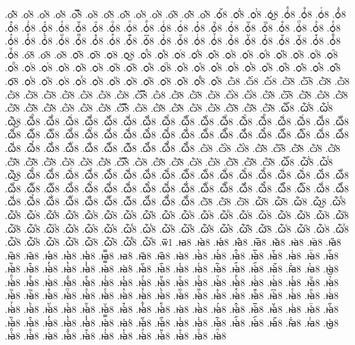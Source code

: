 {.ѻ҆̑8
.ѻ҆̓8
.ѻ҆̔8
.ѻ҆̾8
.ѻ҆̿8
.ѻ҆͘8
.ѻ҆҃8
.ѻ҆҄8
.ѻ҆҅8
.ѻ҆҆8
.ѻ҆҇8
.ѻ҆᷀8
.ѻ҆᷁8
.ѻ҆᷶8
.ѻ᷷҆8
.ѻ᷸҆8
.ѻ᷹҆8
.ѻ҆ⷠ8
.ѻ҆ⷡ8
.ѻ҆ⷢ8
.ѻ҆ⷣ8
.ѻ҆ⷤ8
.ѻ҆ⷥ8
.ѻ҆ⷦ8
.ѻ҆ⷧ8
.ѻ҆ⷨ8
.ѻ҆ⷩ8
.ѻ҆ⷪ8
.ѻ҆ⷫ8
.ѻ҆ⷬ8
.ѻ҆ⷭ8
.ѻ҆ⷮ8
.ѻ҆ⷯ8
.ѻ҆ⷰ8
.ѻ҆ⷱ8
.ѻ҆ⷲ8
.ѻ҆ⷳ8
.ѻ҆ⷴ8
.ѻ҆ⷵ8
.ѻ҆ⷶ8
.ѻ҆ⷷ8
.ѻ҆ⷸ8
.ѻ҆ⷹ8
.ѻ҆ⷺ8
.ѻ҆ⷻ8
.ѻ҆ⷼ8
.ѻ҆ⷽ8
.ѻ҆ⷾ8
.ѻ҆ⷿ8
.ѻ҆꙯8
.ѻ҆ꙴ8
.ѻ҆ꙵ8
.ѻ҆ꙶ8
.ѻ҆ꙷ8
.ѻ҆ꙸ8
.ѻ҆ꙹ8
.ѻ҆ꙺ8
.ѻ҆ꙻ8
.ѻ҆꙼8
.ѻ҆꙽8
.ѻ҆ꚞ8
.ѻ҆ꚟ8
.ѻ҇8
.ѻ᷀8
.ѻ᷁8
.ѻ᷶8
.ѻ᷷8
.ѻ᷸8
.ѻ᷹8
.ѻⷠ8
.ѻⷡ8
.ѻⷢ8
.ѻⷣ8
.ѻⷤ8
.ѻⷥ8
.ѻⷦ8
.ѻⷧ8
.ѻⷨ8
.ѻⷩ8
.ѻⷪ8
.ѻⷫ8
.ѻⷬ8
.ѻⷭ8
.ѻⷮ8
.ѻⷯ8
.ѻⷰ8
.ѻⷱ8
.ѻⷲ8
.ѻⷳ8
.ѻⷴ8
.ѻⷵ8
.ѻⷶ8
.ѻⷷ8
.ѻⷸ8
.ѻⷹ8
.ѻⷺ8
.ѻⷻ8
.ѻⷼ8
.ѻⷽ8
.ѻⷾ8
.ѻⷿ8
.ѻ꙯8
.ѻꙴ8
.ѻꙵ8
.ѻꙶ8
.ѻꙷ8
.ѻꙸ8
.ѻꙹ8
.ѻꙺ8
.ѻꙻ8
.ѻ꙼8
.ѻ꙽8
.ѻꚞ8
.ѻꚟ8
.ѽ8
.ѽ̀8
.ѽ́8
.ѽ̂8
.ѽ̅8
.ѽ̆8
.ѽ̇8
.ѽ̈8
.ѽ̋8
.ѽ̏8
.ѽ̑8
.ѽ̓8
.ѽ̔8
.ѽ̾8
.ѽ̿8
.ѽ͘8
.ѽ҃8
.ѽ҄8
.ѽ҅8
.ѽ҅̀8
.ѽ҅́8
.ѽ҅̂8
.ѽ҅̅8
.ѽ҅̆8
.ѽ҅̇8
.ѽ҅̈8
.ѽ҅̋8
.ѽ҅̏8
.ѽ҅̑8
.ѽ҅̓8
.ѽ҅̔8
.ѽ҅̾8
.ѽ҅̿8
.ѽ҅͘8
.ѽ҅҃8
.ѽ҅҄8
.ѽ҅҅8
.ѽ҅҆8
.ѽ҅҇8
.ѽ҅᷀8
.ѽ҅᷁8
.ѽ҅᷶8
.ѽ᷷҅8
.ѽ᷸҅8
.ѽ᷹҅8
.ѽ҅ⷠ8
.ѽ҅ⷡ8
.ѽ҅ⷢ8
.ѽ҅ⷣ8
.ѽ҅ⷤ8
.ѽ҅ⷥ8
.ѽ҅ⷦ8
.ѽ҅ⷧ8
.ѽ҅ⷨ8
.ѽ҅ⷩ8
.ѽ҅ⷪ8
.ѽ҅ⷫ8
.ѽ҅ⷬ8
.ѽ҅ⷭ8
.ѽ҅ⷮ8
.ѽ҅ⷯ8
.ѽ҅ⷰ8
.ѽ҅ⷱ8
.ѽ҅ⷲ8
.ѽ҅ⷳ8
.ѽ҅ⷴ8
.ѽ҅ⷵ8
.ѽ҅ⷶ8
.ѽ҅ⷷ8
.ѽ҅ⷸ8
.ѽ҅ⷹ8
.ѽ҅ⷺ8
.ѽ҅ⷻ8
.ѽ҅ⷼ8
.ѽ҅ⷽ8
.ѽ҅ⷾ8
.ѽ҅ⷿ8
.ѽ҅꙯8
.ѽ҅ꙴ8
.ѽ҅ꙵ8
.ѽ҅ꙶ8
.ѽ҅ꙷ8
.ѽ҅ꙸ8
.ѽ҅ꙹ8
.ѽ҅ꙺ8
.ѽ҅ꙻ8
.ѽ҅꙼8
.ѽ҅꙽8
.ѽ҅ꚞ8
.ѽ҅ꚟ8
.ѽ҆8
.ѽ҆̀8
.ѽ҆́8
.ѽ҆̂8
.ѽ҆̅8
.ѽ҆̆8
.ѽ҆̇8
.ѽ҆̈8
.ѽ҆̋8
.ѽ҆̏8
.ѽ҆̑8
.ѽ҆̓8
.ѽ҆̔8
.ѽ҆̾8
.ѽ҆̿8
.ѽ҆͘8
.ѽ҆҃8
.ѽ҆҄8
.ѽ҆҅8
.ѽ҆҆8
.ѽ҆҇8
.ѽ҆᷀8
.ѽ҆᷁8
.ѽ҆᷶8
.ѽ᷷҆8
.ѽ᷸҆8
.ѽ᷹҆8
.ѽ҆ⷠ8
.ѽ҆ⷡ8
.ѽ҆ⷢ8
.ѽ҆ⷣ8
.ѽ҆ⷤ8
.ѽ҆ⷥ8
.ѽ҆ⷦ8
.ѽ҆ⷧ8
.ѽ҆ⷨ8
.ѽ҆ⷩ8
.ѽ҆ⷪ8
.ѽ҆ⷫ8
.ѽ҆ⷬ8
.ѽ҆ⷭ8
.ѽ҆ⷮ8
.ѽ҆ⷯ8
.ѽ҆ⷰ8
.ѽ҆ⷱ8
.ѽ҆ⷲ8
.ѽ҆ⷳ8
.ѽ҆ⷴ8
.ѽ҆ⷵ8
.ѽ҆ⷶ8
.ѽ҆ⷷ8
.ѽ҆ⷸ8
.ѽ҆ⷹ8
.ѽ҆ⷺ8
.ѽ҆ⷻ8
.ѽ҆ⷼ8
.ѽ҆ⷽ8
.ѽ҆ⷾ8
.ѽ҆ⷿ8
.ѽ҆꙯8
.ѽ҆ꙴ8
.ѽ҆ꙵ8
.ѽ҆ꙶ8
.ѽ҆ꙷ8
.ѽ҆ꙸ8
.ѽ҆ꙹ8
.ѽ҆ꙺ8
.ѽ҆ꙻ8
.ѽ҆꙼8
.ѽ҆꙽8
.ѽ҆ꚞ8
.ѽ҆ꚟ8
.ѽ҇8
.ѽ᷀8
.ѽ᷁8
.ѽ᷶8
.ѽ᷷8
.ѽ᷸8
.ѽ᷹8
.ѽⷠ8
.ѽⷡ8
.ѽⷢ8
.ѽⷣ8
.ѽⷤ8
.ѽⷥ8
.ѽⷦ8
.ѽⷧ8
.ѽⷨ8
.ѽⷩ8
.ѽⷪ8
.ѽⷫ8
.ѽⷬ8
.ѽⷭ8
.ѽⷮ8
.ѽⷯ8
.ѽⷰ8
.ѽⷱ8
.ѽⷲ8
.ѽⷳ8
.ѽⷴ8
.ѽⷵ8
.ѽⷶ8
.ѽⷷ8
.ѽⷸ8
.ѽⷹ8
.ѽⷺ8
.ѽⷻ8
.ѽⷼ8
.ѽⷽ8
.ѽⷾ8
.ѽⷿ8
.ѽ꙯8
.ѽꙴ8
.ѽꙵ8
.ѽꙶ8
.ѽꙷ8
.ѽꙸ8
.ѽꙹ8
.ѽꙺ8
.ѽꙻ8
.ѽ꙼8
.ѽ꙽8
.ѽꚞ8
.ѽꚟ8
.ѿ1
.ꙗ8
.ꙗ̀8
.ꙗ́8
.ꙗ̂8
.ꙗ̅8
.ꙗ̆8
.ꙗ̇8
.ꙗ̈8
.ꙗ̋8
.ꙗ̏8
.ꙗ̑8
.ꙗ̓8
.ꙗ̔8
.ꙗ̾8
.ꙗ̿8
.ꙗ͘8
.ꙗ҃8
.ꙗ҄8
.ꙗ҅8
.ꙗ҅̀8
.ꙗ҅́8
.ꙗ҅̂8
.ꙗ҅̅8
.ꙗ҅̆8
.ꙗ҅̇8
.ꙗ҅̈8
.ꙗ҅̋8
.ꙗ҅̏8
.ꙗ҅̑8
.ꙗ҅̓8
.ꙗ҅̔8
.ꙗ҅̾8
.ꙗ҅̿8
.ꙗ҅͘8
.ꙗ҅҃8
.ꙗ҅҄8
.ꙗ҅҅8
.ꙗ҅҆8
.ꙗ҅҇8
.ꙗ҅᷀8
.ꙗ҅᷁8
.ꙗ҅᷶8
.ꙗ᷷҅8
.ꙗ᷸҅8
.ꙗ᷹҅8
.ꙗ҅ⷠ8
.ꙗ҅ⷡ8
.ꙗ҅ⷢ8
.ꙗ҅ⷣ8
.ꙗ҅ⷤ8
.ꙗ҅ⷥ8
.ꙗ҅ⷦ8
.ꙗ҅ⷧ8
.ꙗ҅ⷨ8
.ꙗ҅ⷩ8
.ꙗ҅ⷪ8
.ꙗ҅ⷫ8
.ꙗ҅ⷬ8
.ꙗ҅ⷭ8
.ꙗ҅ⷮ8
.ꙗ҅ⷯ8
.ꙗ҅ⷰ8
.ꙗ҅ⷱ8
.ꙗ҅ⷲ8
.ꙗ҅ⷳ8
.ꙗ҅ⷴ8
.ꙗ҅ⷵ8
.ꙗ҅ⷶ8
.ꙗ҅ⷷ8
.ꙗ҅ⷸ8
.ꙗ҅ⷹ8
.ꙗ҅ⷺ8
.ꙗ҅ⷻ8
.ꙗ҅ⷼ8
.ꙗ҅ⷽ8
.ꙗ҅ⷾ8
.ꙗ҅ⷿ8
.ꙗ҅꙯8
.ꙗ҅ꙴ8
.ꙗ҅ꙵ8
.ꙗ҅ꙶ8
.ꙗ҅ꙷ8
.ꙗ҅ꙸ8
.ꙗ҅ꙹ8
.ꙗ҅ꙺ8
.ꙗ҅ꙻ8
.ꙗ҅꙼8
.ꙗ҅꙽8
.ꙗ҅ꚞ8
.ꙗ҅ꚟ8
.ꙗ҆8
.ꙗ҆̀8
.ꙗ҆́8
.ꙗ҆̂8
.ꙗ҆̅8
.ꙗ҆̆8
.ꙗ҆̇8
.ꙗ҆̈8
.ꙗ҆̋8
.ꙗ҆̏8
.ꙗ҆̑8
.ꙗ҆̓8
.ꙗ҆̔8
.ꙗ҆̾8
.ꙗ҆̿8
.ꙗ҆͘8
.ꙗ҆҃8
.ꙗ҆҄8
.ꙗ҆҅8
.ꙗ҆҆8
.ꙗ҆҇8
.ꙗ҆᷀8
.ꙗ҆᷁8
.ꙗ҆᷶8
.ꙗ᷷҆8
.ꙗ᷸҆8
.ꙗ᷹҆8
.ꙗ҆ⷠ8
.ꙗ҆ⷡ8
.ꙗ҆ⷢ8
.ꙗ҆ⷣ8
.ꙗ҆ⷤ8
.ꙗ҆ⷥ8
.ꙗ҆ⷦ8
.ꙗ҆ⷧ8
.ꙗ҆ⷨ8
.ꙗ҆ⷩ8
.ꙗ҆ⷪ8
.ꙗ҆ⷫ8
}
